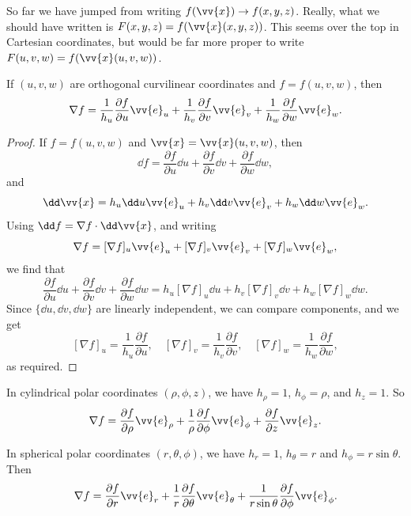 \begin{remark}
	So far we have jumped from writing $f(\vv{x}) \rightarrow f(x, y, z)$. Really, what we should have written is $F(x, y, z) = f(\vv{x}(x, y, z))$. This seems over the top in Cartesian coordinates, but would be far more proper to write $F(u, v, w) = f(\vv{x}(u, v, w))$.
\end{remark}

\begin{proposition}
	If $(u, v, w)$ are orthogonal curvilinear coordinates and $f = f(u, v, w)$, then
	$$
	\nabla f = \frac{1}{h_u} \frac{\partial f}{\partial u} \vv{e}_u + \frac{1}{h_v} \frac{\partial f}{\partial v} \vv{e}_v + \frac{1}{h_w} \frac{\partial f}{\partial w} \vv{e}_w.
	$$
\end{proposition}
\begin{proof}
	If $f = f(u, v, w)$ and $\vv{x} = \vv{x}(u, v, w)$, then
	$$
\dd f = \frac{\partial f}{\partial u} \dd u + \frac{\partial f}{\partial v} \dd v + \frac{\partial f}{\partial w} \dd w,
	$$
	and
	$$
	\dd \vv{x} = h_u \dd u \vv{e}_u + h_v \dd v \vv{e}_v + h_w \dd w \vv{e}_w.
	$$
	Using $\dd f = \nabla f \cdot \dd \vv{x}$,  and writing
	$$
	\nabla f = [\nabla f]_u \vv{e}_u + [\nabla f]_v \vv{e}_v + [\nabla f]_w \vv{e}_w,
	$$
	we find that
	$$
	\frac{\partial f}{\partial u} \dd u + \frac{\partial f}{\partial v} \dd v + \frac{\partial f}{\partial w} \dd w = h_u [\nabla f]_u \dd u + h_v [\nabla f]_v \dd v + h_w [\nabla f]_w \dd w.
	$$
	Since $\{\dd u, \dd v, \dd w\}$ are linearly independent, we can compare components, and we get 
	$$
	[\nabla f]_u = \frac{1}{h_u} \frac{\partial f}{\partial u},
	 \quad [\nabla f]_v = \frac{1}{h_v} \frac{\partial f}{\partial v}, 
	\quad [\nabla f]_w = \frac{1}{h_w} \frac{\partial f}{\partial w},
	$$
	as required.
\end{proof}

\begin{example}
	In cylindrical polar coordinates $(\rho, \phi, z)$, we have $h_\rho = 1$, $h_\phi = \rho$, and $h_z = 1$. So
	$$
	\nabla f = \frac{\partial f}{\partial \rho} \vv{e}_\rho + \frac{1}{\rho}\frac{\partial f}{\partial \phi} \vv{e}_\phi + \frac{\partial f}{\partial z} \vv{e}_z.
	$$

	In spherical polar coordinates $(r, \theta, \phi)$, we have $h_r = 1$, $h_\theta = r$ and $h_\phi = r \sin \theta$. Then
	$$
\nabla f = \frac{\partial f}{\partial r} \vv{e}_r + \frac{1}{r} \frac{\partial f}{\partial \theta} \vv{e}_\theta + \frac{1}{ r \sin \theta} \frac{\partial f}{\partial \phi} \vv{e}_\phi.
	$$
\end{example}

